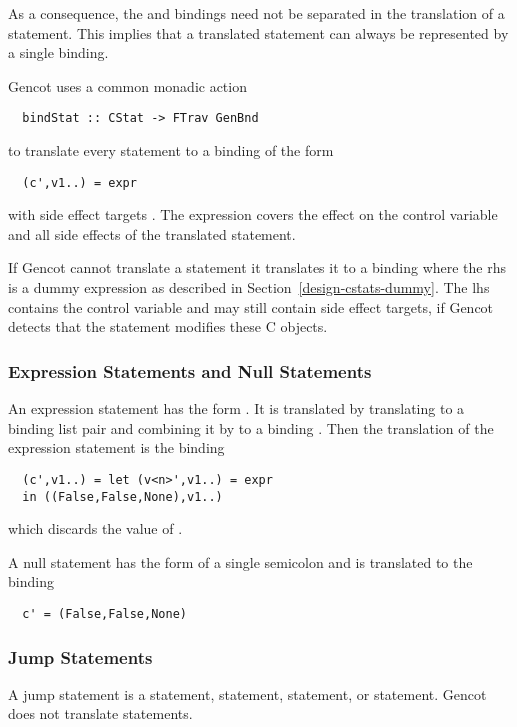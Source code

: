 As a consequence, the  and  bindings need not be separated in the translation of a statement.
This implies that a translated statement can always be represented by a single binding.

Gencot uses a common monadic action 
\begin{verbatim}
  bindStat :: CStat -> FTrav GenBnd
\end{verbatim}
to translate every statement to a binding of the form
\begin{verbatim}
  (c',v1..) = expr
\end{verbatim}
with side effect targets . The expression  covers the effect on the control variable and 
all side effects of the translated statement.

If Gencot cannot translate a statement it translates it to a binding where the rhs is a dummy expression as described in 
Section~\ref{design-cstats-dummy}. The lhs contains the control variable and may still contain side effect targets, if 
Gencot detects that the statement modifies these C objects.

\subsubsection{Expression Statements and Null Statements}

An expression statement has the form . It is translated by translating  to a binding list pair and 
combining it by  to a binding . Then the translation of the expression statement
is the binding
\begin{verbatim}
  (c',v1..) = let (v<n>',v1..) = expr
  in ((False,False,None),v1..)
\end{verbatim}
which discards the value  of .

A null statement has the form of a single semicolon \code{;} and is translated to the
binding
\begin{verbatim}
  c' = (False,False,None)
\end{verbatim}

\subsubsection{Jump Statements}

A jump statement is a  statement,  statement,  statement, or  statement.
Gencot does not translate  statements.

